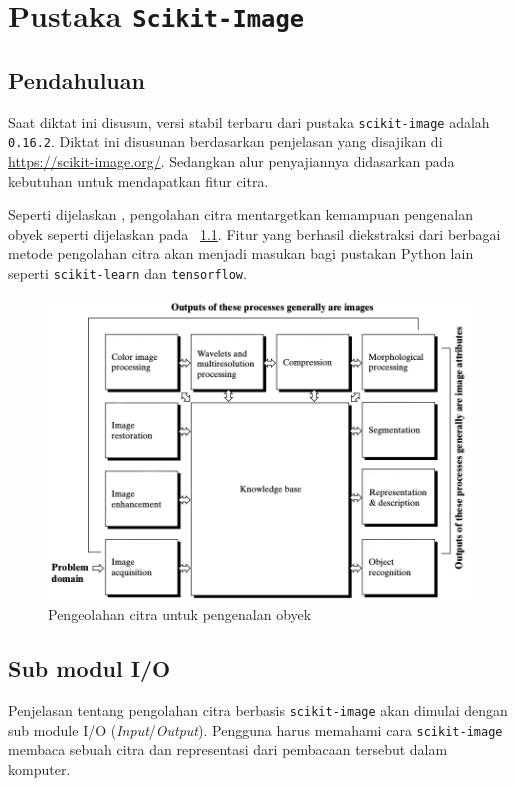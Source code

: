 \chapter{Pustaka \texttt{Scikit-Image}}
\section{Pendahuluan}

Saat diktat ini disusun, versi stabil terbaru dari pustaka \texttt{scikit-image} adalah \texttt{0.16.2}. Diktat ini disusunan berdasarkan penjelasan yang disajikan di \url{https://scikit-image.org/}. Sedangkan alur penyajiannya didasarkan pada kebutuhan untuk mendapatkan fitur citra.

Seperti dijelaskan \cite{Gonzalez}, pengolahan citra mentargetkan kemampuan pengenalan obyek seperti dijelaskan pada \figurename~\ref{fig:targetProcessing}. Fitur yang berhasil diekstraksi dari berbagai metode pengolahan citra akan menjadi masukan bagi pustakan Python lain seperti \texttt{scikit-learn} dan \texttt{tensorflow}.

\begin{figure}[h!]
  \begin{center}
    \includegraphics[scale=.5]{pics/steps.png}
    \caption{Pengeolahan citra untuk pengenalan obyek \cite{Gonzalez}}
    \label{fig:targetProcessing}
  \end{center}
\end{figure}

\section{Sub modul I/O}
Penjelasan tentang pengolahan citra berbasis \texttt{scikit-image} akan dimulai dengan sub module I/O (\textit{Input}/\textit{Output}). Pengguna harus memahami cara \texttt{scikit-image} membaca sebuah citra dan representasi dari pembacaan tersebut dalam komputer.
